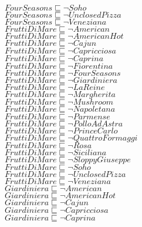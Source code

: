 \documentclass[a4paper,10pt]{article}
\begin{document}
 $FourSeasons \sqsubseteq  \lnot Soho$\\ 
 $FourSeasons \sqsubseteq  \lnot UnclosedPizza$\\ 
 $FourSeasons \sqsubseteq  \lnot Veneziana$\\ 
 $FruttiDiMare \sqsubseteq  \lnot American$\\ 
 $FruttiDiMare \sqsubseteq  \lnot AmericanHot$\\ 
 $FruttiDiMare \sqsubseteq  \lnot Cajun$\\ 
 $FruttiDiMare \sqsubseteq  \lnot Capricciosa$\\ 
 $FruttiDiMare \sqsubseteq  \lnot Caprina$\\ 
 $FruttiDiMare \sqsubseteq  \lnot Fiorentina$\\ 
 $FruttiDiMare \sqsubseteq  \lnot FourSeasons$\\ 
 $FruttiDiMare \sqsubseteq  \lnot Giardiniera$\\ 
 $FruttiDiMare \sqsubseteq  \lnot LaReine$\\ 
 $FruttiDiMare \sqsubseteq  \lnot Margherita$\\ 
 $FruttiDiMare \sqsubseteq  \lnot Mushroom$\\ 
 $FruttiDiMare \sqsubseteq  \lnot Napoletana$\\ 
 $FruttiDiMare \sqsubseteq  \lnot Parmense$\\ 
 $FruttiDiMare \sqsubseteq  \lnot PolloAdAstra$\\ 
 $FruttiDiMare \sqsubseteq  \lnot PrinceCarlo$\\ 
 $FruttiDiMare \sqsubseteq  \lnot QuattroFormaggi$\\ 
 $FruttiDiMare \sqsubseteq  \lnot Rosa$\\ 
 $FruttiDiMare \sqsubseteq  \lnot Siciliana$\\ 
 $FruttiDiMare \sqsubseteq  \lnot SloppyGiuseppe$\\ 
 $FruttiDiMare \sqsubseteq  \lnot Soho$\\ 
 $FruttiDiMare \sqsubseteq  \lnot UnclosedPizza$\\ 
 $FruttiDiMare \sqsubseteq  \lnot Veneziana$\\ 
 $Giardiniera \sqsubseteq  \lnot American$\\ 
 $Giardiniera \sqsubseteq  \lnot AmericanHot$\\ 
 $Giardiniera \sqsubseteq  \lnot Cajun$\\ 
 $Giardiniera \sqsubseteq  \lnot Capricciosa$\\ 
 $Giardiniera \sqsubseteq  \lnot Caprina$\\ 
\end{document}
